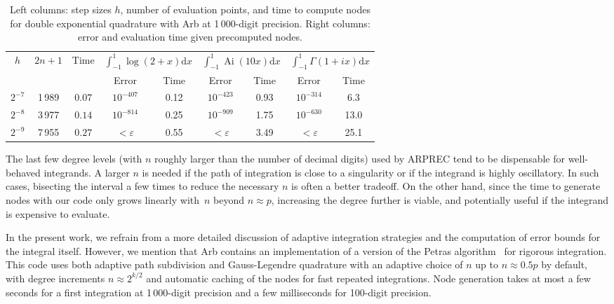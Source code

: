 \documentclass[nohypdvips,review]{siamart0216}
\newcommand{\dx}{\mathrm d x}
\begin{document}
\begin{table}[t!]
\caption{Left columns: step sizes $h$, number of evaluation
points, and time to compute nodes for double exponential quadrature with Arb
at 1\,000-digit precision. Right columns: error and evaluation
time given precomputed nodes.}
\begin{center}
\begin{tabular}{ c c c | c c | c c | c c }
$h$ & $2n+1$ & Time &
    \multicolumn{2}{|c|}{$\int_{-1}^{1}\!\log(2\!+\!x) \dx$} &
    \multicolumn{2}{|c|}{$\int_{-1}^{1}\!\operatorname{Ai}(10 x) \dx$} &
    \multicolumn{2}{|c}{$\int_{-1}^{1}\!\Gamma(1\!+\!ix) \dx$} \\
   &         &          & Error   & Time      &  Error & Time  &  Error & Time \\ \hline
\rule{0pt}{3ex}$2^{-7}$ & 1\,989 & $0.07$ & $10^{-407}$ & 0.12 & $10^{-423}$ & 0.93 & $10^{-314}$ & 6.3 \\
$2^{-8}$ & 3\,977 & $0.14$ & $10^{-814}$ & 0.25 & $10^{-909}$ & 1.75 & $10^{-630}$ & 13.0 \\
$2^{-9}$ & 7\,955 & $0.27$ & $<\varepsilon$ & 0.55 & $<\varepsilon$ & 3.49 & $<\varepsilon$ & 25.1
\end{tabular}
\label{tab:dequad}
\end{center}
\end{table}

The last few degree levels (with $n$ roughly larger than
the number of decimal digits) used by ARPREC
tend to be dispensable for well-behaved integrands.
A larger $n$ is needed if the path of integration
is close to a singularity or if the integrand is highly oscillatory.
In such cases, bisecting the interval a few times
to reduce the necessary $n$ is often a better tradeoff.
On the other hand, since the time to generate nodes with our code only
grows linearly with~$n$ beyond $n \approx p$,
increasing the degree further is viable,
and potentially useful if the integrand is expensive to evaluate.

In the present work, we refrain from a more detailed discussion of
adaptive integration strategies and the computation
of error bounds for the integral itself.
However, we mention that Arb contains an implementation of a
version of the Petras algorithm~\cite{petras2002self} for rigorous
integration. This code uses both adaptive path subdivision
and Gauss-Legendre quadrature with an adaptive choice of $n$ up to
$n \approx 0.5p$ by default, with degree increments
$n \approx 2^{k/2}$ and automatic caching of the nodes
for fast repeated integrations.
Node generation takes at most a few seconds for a first integration
at 1\,000-digit precision
and a few milliseconds for 100-digit precision.
\end{document}

